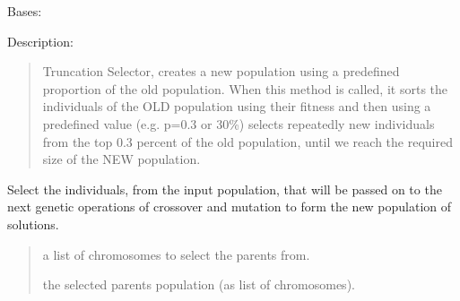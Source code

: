 \documentclass[letterpaper,10pt,english]{sphinxmanual}
\begin{document}
\begin{fulllineitems}
\label{\detokenize{pygenalgo.operators.selection:pygenalgo.operators.selection.truncation_selector.TruncationSelector}}
\pysigstartsignatures
{}
\pysigstopsignatures
\sphinxAtStartPar
Bases: {\hyperref[\detokenize{pygenalgo.operators.selection:pygenalgo.operators.selection.select_operator.SelectionOperator}]{}}

\sphinxAtStartPar
Description:
\begin{quote}

\sphinxAtStartPar
Truncation Selector, creates a new population using a pre\sphinxhyphen{}defined proportion of the old population.
When this method is called, it sorts the individuals of the OLD population using their fitness and
then using a predefined value (e.g. p=0.3 or 30\%) selects repeatedly new individuals from the top
0.3 percent of the old population, until we reach the required size of the NEW population.
\end{quote}

\begin{fulllineitems}
\label{\detokenize{pygenalgo.operators.selection:pygenalgo.operators.selection.truncation_selector.TruncationSelector.select}}
\pysigstartsignatures
{}
\pysigstopsignatures
\sphinxAtStartPar
Select the individuals, from the input population, that will be passed on to the next
genetic operations of crossover and mutation to form the new population of solutions.
\begin{quote}\begin{description}
\sphinxAtStartPar
{} \textendash{} a list of chromosomes to select the parents from.

\sphinxAtStartPar
the selected parents population (as list of chromosomes).

\end{description}\end{quote}

\end{fulllineitems}


\end{fulllineitems}
\end{document}
